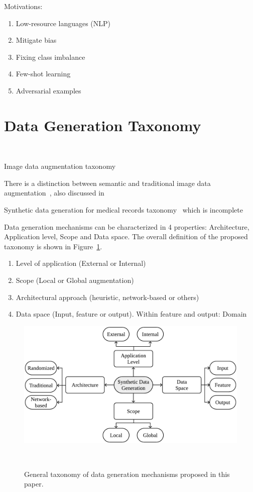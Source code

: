 \documentclass[parskip=full]{scrartcl}
\begin{document}
Motivations:

\begin{enumerate}
    \item Low-resource languages (NLP)
    \item Mitigate bias
    \item Fixing class imbalance
    \item Few-shot learning
    \item Adversarial examples
\end{enumerate}


\section{Data Generation Taxonomy}~\label{sec:taxonomy}

Image data augmentation taxonomy~\cite{khalifa2021comprehensive}

There is a distinction between semantic and traditional image data
augmentation~\cite{wang2021regularizing}, also discussed
in~\cite{shorten2019survey} 

Synthetic data generation for medical records
taxonomy~\cite{hernandez2022synthetic} which is incomplete



Data generation mechanisms can be characterized in 4 properties: Architecture,
Application level, Scope and Data space. The overall definition of the
proposed taxonomy is shown in Figure~\ref{fig:data-generation-taxonomy}.

\begin{enumerate}
    \item Level of application (External or Internal)
    \item Scope (Local or Global augmentation)
    \item Architectural approach (heuristic, network-based or others)
    \item Data space (Input, feature or output). Within feature and output: Domain
\end{enumerate}

\begin{figure}
	\centering
	\includegraphics[width=.8\linewidth]{../analysis/data-generation-taxonomy}
    \caption{General taxonomy of data generation mechanisms proposed in this
        paper.
    }~\label{fig:data-generation-taxonomy}
\end{figure}
\end{document}
